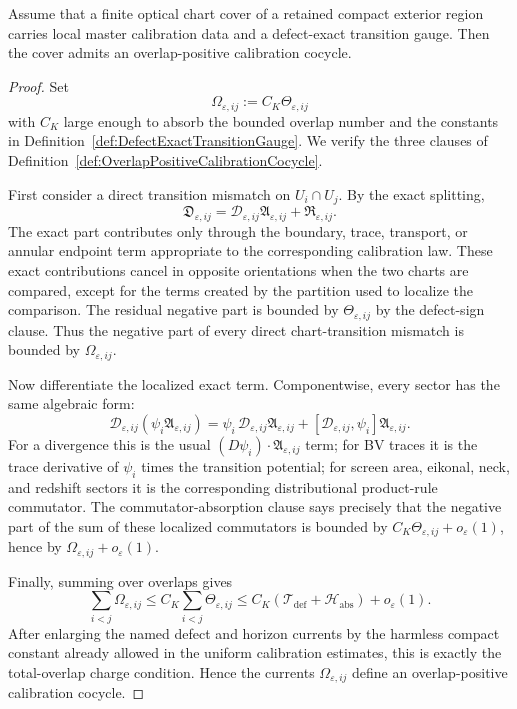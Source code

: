 \begin{theorem}\label{thm:DefectExactGaugePositiveCocycle}
Assume that a finite optical chart cover of a retained compact exterior region carries local master calibration data and a defect-exact transition gauge. Then the cover admits an overlap-positive calibration cocycle.
\end{theorem}

\begin{proof}
Set
\[
    \Omega_{\varepsilon,ij}:=C_K\Theta_{\varepsilon,ij}
\]
with $C_K$ large enough to absorb the bounded overlap number and the constants in Definition~\ref{def:DefectExactTransitionGauge}. We verify the three clauses of Definition~\ref{def:OverlapPositiveCalibrationCocycle}.

First consider a direct transition mismatch on $U_i\cap U_j$. By the exact splitting,
\[
    \mathfrak D_{\varepsilon,ij}
    =
    \mathscr D_{\varepsilon,ij}\mathfrak A_{\varepsilon,ij}
    +
    \mathfrak R_{\varepsilon,ij}.
\]
The exact part contributes only through the boundary, trace, transport, or annular endpoint term appropriate to the corresponding calibration law. These exact contributions cancel in opposite orientations when the two charts are compared, except for the terms created by the partition used to localize the comparison. The residual negative part is bounded by $\Theta_{\varepsilon,ij}$ by the defect-sign clause. Thus the negative part of every direct chart-transition mismatch is bounded by $\Omega_{\varepsilon,ij}$.

Now differentiate the localized exact term. Componentwise, every sector has the same algebraic form:
\[
    \mathscr D_{\varepsilon,ij}(\psi_i\mathfrak A_{\varepsilon,ij})
    =
    \psi_i\,\mathscr D_{\varepsilon,ij}\mathfrak A_{\varepsilon,ij}
    +
    [\mathscr D_{\varepsilon,ij},\psi_i]\mathfrak A_{\varepsilon,ij}.
\]
For a divergence this is the usual $(D\psi_i)\cdot\mathfrak A_{\varepsilon,ij}$ term; for BV traces it is the trace derivative of $\psi_i$ times the transition potential; for screen area, eikonal, neck, and redshift sectors it is the corresponding distributional product-rule commutator. The commutator-absorption clause says precisely that the negative part of the sum of these localized commutators is bounded by $C_K\Theta_{\varepsilon,ij}+o_\varepsilon(1)$, hence by $\Omega_{\varepsilon,ij}+o_\varepsilon(1)$.

Finally, summing over overlaps gives
\[
    \sum_{i<j}\Omega_{\varepsilon,ij}
    \le
    C_K\sum_{i<j}\Theta_{\varepsilon,ij}
    \le
    C_K\left(\mathcal T_{\mathrm{def}}+\mathcal H_{\mathrm{abs}}\right)
    +o_\varepsilon(1).
\]
After enlarging the named defect and horizon currents by the harmless compact constant already allowed in the uniform calibration estimates, this is exactly the total-overlap charge condition. Hence the currents $\Omega_{\varepsilon,ij}$ define an overlap-positive calibration cocycle.
\end{proof}

